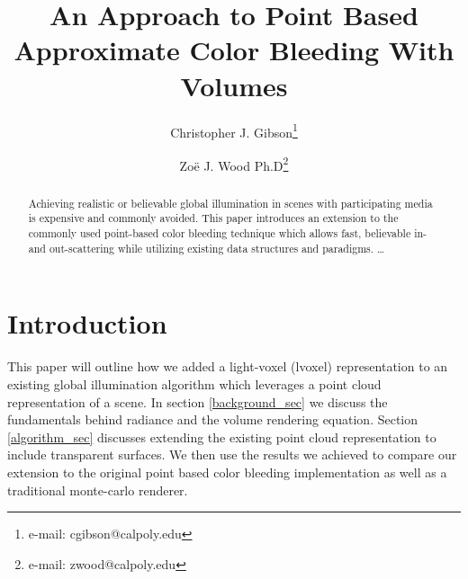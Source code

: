 \documentclass[runningheads]{llncs}
\begin{document}
\pagestyle{headings}

\author{Christopher J. Gibson\thanks{e-mail: cgibson@calpoly.edu}
\and Zo\"{e} J. Wood Ph.D\thanks{e-mail: zwood@calpoly.edu}}


\mainmatter

\title{An Approach to Point Based Approximate Color Bleeding With Volumes}


\maketitle


\begin{abstract}
Achieving realistic or believable global illumination in scenes with participating media is expensive and commonly avoided.  This paper introduces an extension to the commonly used point-based color bleeding technique which allows fast, believable in- and out-scattering while utilizing existing data structures and paradigms.
\dots
\end{abstract}



\section{Introduction}
This paper will outline how we added a light-voxel (lvoxel) representation to an existing global illumination algorithm which leverages a point cloud representation of a scene.  In section \ref{background_sec} we discuss the fundamentals behind radiance and the volume rendering equation.  Section \ref{algorithm_sec} discusses extending the existing point cloud representation to include transparent surfaces.  We then use the results we achieved to compare our extension to the original point based color bleeding implementation as well as a traditional monte-carlo renderer.



\end{document}
